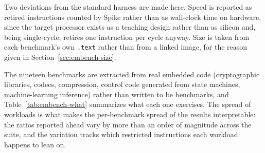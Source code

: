 Two deviations from the standard harness are made here. Speed is reported as retired instructions
counted by Spike rather than as wall-clock time on hardware, since the target processor exists as a
teaching design rather than as silicon and, being single-cycle, retires one instruction per cycle
anyway. Size is taken from each benchmark's own \texttt{.text} rather than from a linked image, for
the reason given in Section~\ref{sec:embench-size}.

The nineteen benchmarks are extracted from real embedded code (cryptographic libraries, codecs,
compression, control code generated from state machines, machine-learning inference) rather than
written to be benchmarks, and Table~\ref{tab:embench-what} summarizes what each one exercises. The
spread of workloads is what makes the per-benchmark spread of the results interpretable: the ratios
reported ahead vary by more than an order of magnitude across the suite, and the variation tracks
which restricted instructions each workload happens to lean on.


